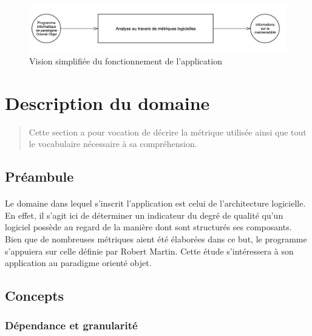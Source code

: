 \documentclass{scrartcl}
\begin{document}
\begin{figure}[ht]
    \centering
    \includegraphics[scale=0.60]{img/intro.png}
    \caption{Vision simplifiée du fonctionnement de l'application} 
    \label{fig:intro}
\end{figure}
    





\newpage
\section{Description du domaine}

    \begin{abstract}
        Cette section a pour vocation de décrire la métrique utilisée ainsi que tout le vocabulaire nécessaire à sa compréhension.
    \end{abstract}

\subsection{Préambule}

    \paragraph{}Le domaine dans lequel s'inscrit l'application est celui de l'architecture logicielle. En effet, il s'agit ici de déterminer un indicateur du degré de qualité qu'un logiciel possède au regard de la manière dont sont structurés ses composants. Bien que de nombreuses métriques aient été élaborées dans ce but, le programme s'appuiera sur celle définie par Robert Martin\cite{Martin:1994}. Cette étude s'intéressera à son application au paradigme orienté objet. 
    
\subsection{Concepts}
\label{mm:concepts}

\subsubsection{Dépendance et granularité}
\end{document}
